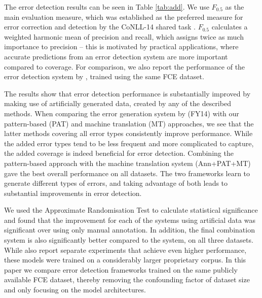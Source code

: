 \documentclass[11pt,letterpaper]{article}
\begin{document}

The error detection results can be seen in Table \ref{tab:add}. We use $F_{0.5}$ as the main evaluation measure, which was established as the preferred measure for error correction and detection by the CoNLL-14 shared task \cite{Ng2013a}. $F_{0.5}$ calculates a weighted harmonic mean of precision and recall, which assigns twice as much importance to precision -- this is motivated by practical applications, where accurate predictions from an error detection system are more important compared to coverage. For comparison, we also report the performance of the error detection system by , trained using the same FCE dataset.

The results show that error detection performance is substantially improved by making use of artificially generated data, created by any of the described methods.
When comparing the error generation system by  (FY14) with our pattern-based (PAT) and machine translation (MT) approaches, we see that the latter methods covering all error types consistently improve performance. 
While the added error types tend to be less frequent and more complicated to capture, the added coverage is indeed beneficial for error detection.
Combining the pattern-based approach with the machine translation system (Ann+PAT+MT) gave the best overall performance on all datasets. The two frameworks learn to generate different types of errors, and taking advantage of both leads to substantial improvements in error detection.

We used the Approximate Randomisation Test \cite{Noreen1989,Cohen1995} to calculate statistical significance and found that the improvement for each of the systems using artificial data was significant over using only manual annotation. In addition, the final combination system is also significantly better compared to the  system, on all three datasets.
While  also report separate experiments that achieve even higher performance, these models were trained on a considerably larger proprietary corpus.
In this paper we compare error detection frameworks trained on the same publicly available FCE dataset, thereby removing the confounding factor of dataset size and only focusing on the model architectures.
\end{document}
